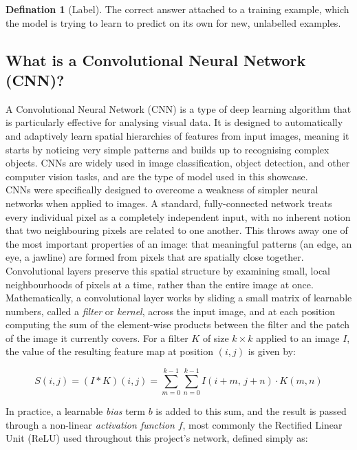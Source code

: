 \documentclass[11 pt , a 4 paper ]{article}
\theoremstyle{definition}
\newtheorem{thm}{Defination}
\begin{document}
\begin{thm}[Label]
The correct answer attached to a training example, which the model is trying to learn to predict on its own for new, unlabelled examples.
\end{thm}
 
\subsection{What is a Convolutional Neural Network (CNN)?}
 
A Convolutional Neural Network (CNN) is a type of deep learning algorithm that is particularly effective for analysing visual data. It is designed to automatically and adaptively learn spatial hierarchies of features from input images, meaning it starts by noticing very simple patterns and builds up to recognising complex objects. CNNs are widely used in image classification, object detection, and other computer vision tasks, and are the type of model used in this showcase.\\
 
\noindent CNNs were specifically designed to overcome a weakness of simpler neural networks when applied to images. A standard, fully-connected network treats every individual pixel as a completely independent input, with no inherent notion that two neighbouring pixels are related to one another. This throws away one of the most important properties of an image: that meaningful patterns (an edge, an eye, a jawline) are formed from pixels that are spatially close together. Convolutional layers preserve this spatial structure by examining small, local neighbourhoods of pixels at a time, rather than the entire image at once.\\
 
\noindent Mathematically, a convolutional layer works by sliding a small matrix of learnable numbers, called a \emph{filter} or \emph{kernel}, across the input image, and at each position computing the sum of the element-wise products between the filter and the patch of the image it currently covers. For a filter $K$ of size $k \times k$ applied to an image $I$, the value of the resulting feature map at position $(i,j)$ is given by:
 
\begin{equation}
S(i,j) = (I * K)(i,j) = \sum_{m=0}^{k-1} \sum_{n=0}^{k-1} I(i+m,\, j+n) \cdot K(m,n)
\end{equation}
 
\noindent In practice, a learnable \emph{bias} term $b$ is added to this sum, and the result is passed through a non-linear \emph{activation function} $f$, most commonly the Rectified Linear Unit (ReLU) used throughout this project's network, defined simply as:
 
\end{document}
